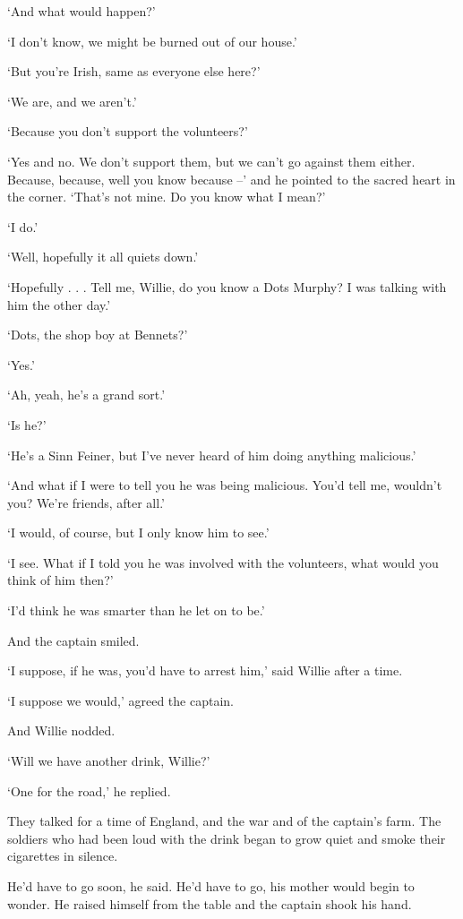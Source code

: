\documentclass[10pt,a4paper]{article}
\begin{document}
‘And what would happen?’

‘I don’t know, we might be burned out of our house.’

‘But you’re Irish, same as everyone else here?’

‘We are, and we aren’t.’

‘Because you don’t support the volunteers?’

‘Yes and no. We don’t support them, but we can’t go against them either. Because, because, well you know because –’ and he pointed to the sacred heart in the corner. ‘That’s not mine. Do you know what I mean?’

‘I do.’

‘Well, hopefully it all quiets down.’

‘Hopefully . . . Tell me, Willie, do you know a Dots Murphy? I was talking with him the other day.’

‘Dots, the shop boy at Bennets?’

‘Yes.’

‘Ah, yeah, he’s a grand sort.’

‘Is he?’

‘He’s a Sinn Feiner, but I’ve never heard of him doing anything malicious.’

‘And what if I were to tell you he was being malicious. You’d tell me, wouldn’t you? We’re friends, after all.’

‘I would, of course, but I only know him to see.’

‘I see. What if I told you he was involved with the volunteers, what would you think of him then?’

‘I’d think he was smarter than he let on to be.’

And the captain smiled.

‘I suppose, if he was, you’d have to arrest him,’ said Willie after a time.

‘I suppose we would,’ agreed the captain.

And Willie nodded.

‘Will we have another drink, Willie?’

‘One for the road,’ he replied.

They talked for a time of England, and the war and of the captain’s farm. The soldiers who had been loud with the drink began to grow quiet and smoke their cigarettes in silence.

He’d have to go soon, he said. He’d have to go, his mother would begin to wonder. He raised himself from the table and the captain shook his hand.
\end{document}
